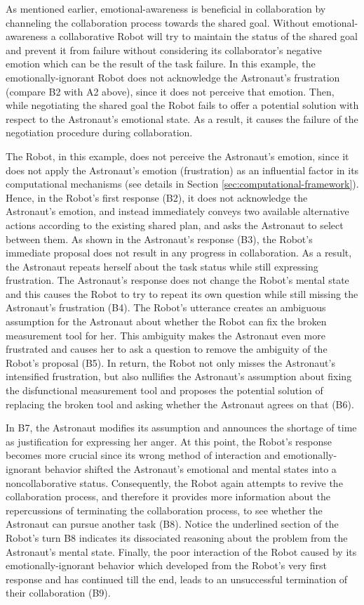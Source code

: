 As mentioned earlier, emotional-awareness is beneficial in collaboration by
channeling the collaboration process towards the shared goal. Without
emotional-awareness a collaborative Robot will try to maintain the status of the
shared goal and prevent it from failure without considering its collaborator's
negative emotion which can be the result of the task failure. In this example,
the emotionally-ignorant Robot does not acknowledge the Astronaut's frustration
(compare B2 with A2 above), since it does not perceive that emotion. Then, while
negotiating the shared goal the Robot fails to offer a potential solution with
respect to the Astronaut's emotional state. As a result, it causes the failure
of the negotiation procedure during collaboration.

The Robot, in this example, does not perceive the Astronaut's emotion, since it
does not apply the Astronaut's emotion (frustration) as an influential factor in
its computational mechanisms (see details in Section
\ref{sec:computational-framework}). Hence, in the Robot's first response (B2),
it does not acknowledge the Astronaut's emotion, and instead immediately conveys
two available alternative actions according to the existing shared plan, and
asks the Astronaut to select between them. As shown in the Astronaut's response
(B3), the Robot's immediate proposal does not result in any progress in
collaboration. As a result, the Astronaut repeats herself about the task status
while still expressing frustration. The Astronaut's response does not change the
Robot's mental state and this causes the Robot to try to repeat its own question
while still missing the Astronaut's frustration (B4). The Robot's utterance
creates an ambiguous assumption for the Astronaut about whether the Robot can
fix the broken measurement tool for her. This ambiguity makes the Astronaut even
more frustrated and causes her to ask a question to remove the ambiguity of the
Robot's proposal (B5). In return, the Robot not only misses the Astronaut's
intensified frustration, but also nullifies the Astronaut's assumption about
fixing the disfunctional measurement tool and proposes the potential solution of
replacing the broken tool and asking whether the Astronaut agrees on that (B6).

In B7, the Astronaut modifies its assumption and announces the shortage of time
as justification for expressing her anger. At this point, the Robot's response
becomes more crucial since its wrong method of interaction and
emotionally-ignorant behavior shifted the Astronaut's emotional and mental
states into a noncollaborative status. Consequently, the Robot again attempts to
revive the collaboration process, and therefore it provides more information
about the repercussions of terminating the collaboration process, to see whether
the Astronaut can pursue another task (B8). Notice the underlined section of the
Robot's turn B8 indicates its dissociated reasoning about the problem from the
Astronaut's mental state. Finally, the poor interaction of the Robot caused by
its emotionally-ignorant behavior which developed from the Robot's very first
response and has continued till the end, leads to an unsuccessful termination of
their collaboration (B9).\\

